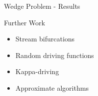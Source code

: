 \documentclass{beamer}
\begin{document}
\begin{frame}{Wedge Problem - Results}
\begin{adjustbox}{max totalsize={\textwidth}{\textheight}}

\end{adjustbox}
\end{frame}

\begin{frame}{Further Work}
    \begin{itemize}
        \item Stream bifurcations
        \item Random driving functions
        \item Kappa-driving
        \item Approximate algorithms
    \end{itemize}
\end{frame}

\end{document}
